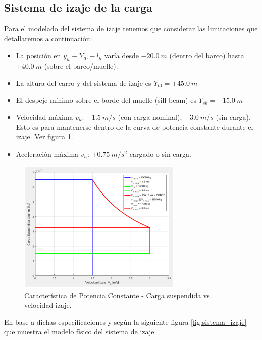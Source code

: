 \documentclass[11pt]{article}
\begin{document}
\subsection{Sistema de izaje de la carga}
\label{section:izaje}

Para el modelado del sistema de izaje tenemos que considerar las limitaciones que detallaremos a continuación:
\begin{itemize}
	\item La posición en $y_{h}\equiv Y_{t0}-l_{h}$ varía desde $-20.0\ m$ (dentro del barco) hasta $+40.0\ m$ (sobre el barco/muelle).
	\item La altura del carro y del sistema de izaje es $Y_{t0}= +45.0\ m$
	\item El despeje mínimo sobre el borde del muelle (sill beam) es $Y_{sb}= +15.0\ m$
	\item Velocidad máxima $v_{h}$: $\pm 1.5\ m/s$ (con carga nominal); $\pm 3.0\ m/s$ (sin carga). Esto es para mantenerse dentro de la curva de potencia constante durante el izaje. Ver figura \ref{fig:curva_potencia_motor}.
	\item Aceleración máxima $\dot{v}_{h}$: $\pm 0.75\ m/s^{2}$ cargado o sin carga.
\end{itemize}

\begin{figure}[h!]
	\centering
	\includegraphics[width=0.7\textwidth]{images/imagen_4_curva_pot_cte.png}
	\caption{Característica de Potencia Constante - Carga suspendida vs. velocidad izaje.}
	\label{fig:curva_potencia_motor}
\end{figure}

\newpage

En base a dichas especificaciones y según la siguiente figura \ref{fig:sistema_izaje} que muestra el modelo físico del sistema de izaje.
\end{document}
